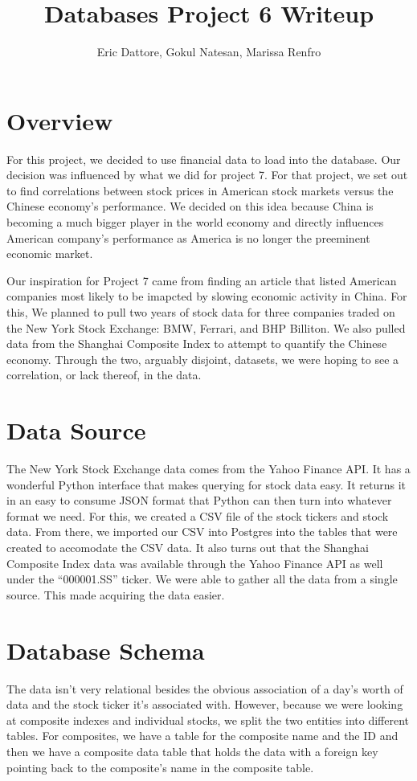 \documentclass{article}
\author{Eric Dattore, Gokul Natesan, Marissa Renfro}
\title{Databases Project 6 Writeup}
\date{}
\begin{document}
    \maketitle

    \section*{Overview}
    For this project, we decided to use financial data to load into the
    database. Our decision was influenced by what we did for project 7.
    For that project, we set out to find correlations between stock prices
    in American stock markets versus the Chinese economy's performance.
    We decided on this idea because China is becoming a much bigger player
    in the world economy and directly influences American company's performance
    as America is no longer the preeminent economic market.

    Our inspiration for Project 7 came from finding an article that listed American
    companies most likely to be imapcted by slowing economic activity in China. For this,
    We planned to pull two years of stock data for three companies traded on the New York
    Stock Exchange: BMW, Ferrari, and BHP Billiton. We also pulled data from the Shanghai Composite
    Index to attempt to quantify the Chinese economy. Through the two, arguably disjoint, datasets, we
    were hoping to see a correlation, or lack thereof, in the data.
    \section*{Data Source}
    The New York Stock Exchange data comes from the Yahoo Finance API. It has a wonderful Python
    interface that makes querying for stock data easy. It returns it in an easy to consume JSON format
    that Python can then turn into whatever format we need. For this, we created a CSV file of the
    stock tickers and stock data. From there, we imported our CSV into Postgres into the tables that
    were created to accomodate the CSV data. It also turns out that the Shanghai Composite Index
    data was available through the Yahoo Finance API as well under the ``000001.SS'' ticker. We were
    able to gather all the data from a single source. This made acquiring the data easier.
    \section*{Database Schema}
    The data isn't very relational besides the obvious association of a day's worth of data and the
    stock ticker it's associated with. However, because we were looking at composite indexes and
    individual stocks, we split the two entities into different tables. For composites, we have a
    table for the composite name and the ID and then we have a composite data table that holds
    the data with a foreign key pointing back to the composite's name in the composite table.
\end{document}
